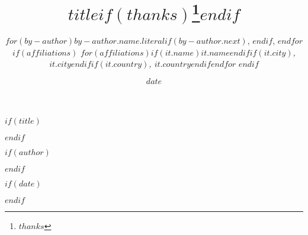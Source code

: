 
$if(title)$
\title{\textbf{$title$}$if(thanks)$\thanks{$thanks$}$endif$}
$endif$

$if(author)$
\author{
  $for(by-author)$$by-author.name.literal$$if(by-author.next)$, $endif$, $endfor$ \\
  $if(affiliations)$
    \textit{$for(affiliations)$$if(it.name)$$it.name$$endif$$if(it.city)$, $it.city$$endif$$if(it.country)$, $it.country$$endif$$endfor$}
  $endif$
}
$endif$

$if(date)$
\date{$date$}
$endif$